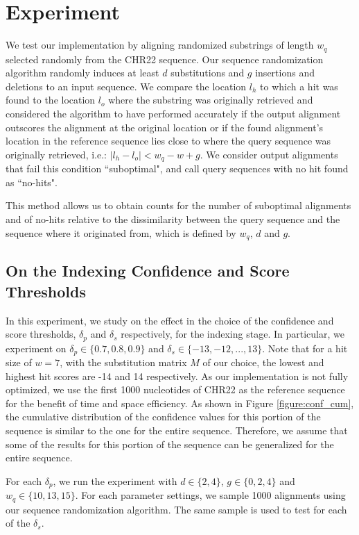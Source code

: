 \documentclass{article}
\begin{document}
\section{Experiment}

We test our implementation by aligning randomized substrings of length $w_q$ selected randomly from the CHR22 sequence. Our sequence randomization algorithm randomly induces at least $d$ substitutions and $g$ insertions and deletions to an input sequence. We compare the location $l_h$ to which a hit was found to the location $l_o$ where the substring was originally retrieved and considered the algorithm to have performed accurately if the output alignment outscores the alignment at the original location or if the found alignment's location in the reference sequence lies close to where the query sequence was originally retrieved, i.e.: $|l_h - l_o| < w_q - w + g$. We consider output alignments that fail this condition ``suboptimal", and call query sequences with no hit found as ``no-hits".

This method allows us to obtain counts for the number of suboptimal alignments and of no-hits relative to the dissimilarity between the query sequence and the sequence where it originated from, which is defined by $w_q$, $d$ and $g$. 

\subsection{On the Indexing Confidence and Score Thresholds}

In this experiment, we study on the effect in the choice of the confidence and score thresholds, $\delta_p$ and $\delta_s$ respectively, for the indexing stage. In particular, we experiment on $\delta_p \in \{0.7, 0.8, 0.9\} $ and $\delta_s \in \{-13, -12, ... , 13\}$. Note that for a hit size of $w = 7$, with the substitution matrix $M$ of our choice, the lowest and highest hit scores are -14 and 14 respectively. As our implementation is not fully optimized, we use the first 1000 nucleotides of CHR22 as the reference sequence for the benefit of time and space efficiency. As shown in Figure \ref{figure:conf_cum}, the cumulative distribution of the confidence values for this portion of the sequence is similar to the one for the entire sequence. Therefore, we assume that some of the results for this portion of the sequence can be generalized for the entire sequence.

For each $\delta_p$, we run the experiment with $d \in \{2, 4\}$, $g \in \{0, 2, 4\}$ and $w_q \in \{10, 13, 15\}$. For each parameter settings, we sample 1000 alignments using our sequence randomization algorithm. The same sample is used to test for each of the $\delta_s$.
\end{document}
